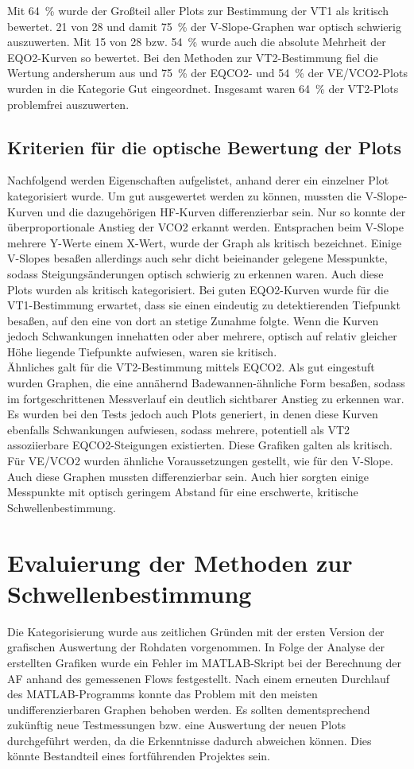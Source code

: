 %
Mit 64~\% wurde der Großteil aller Plots zur Bestimmung der VT1 als kritisch bewertet. 21 von 28 und damit 75~\% der V-Slope-Graphen war optisch schwierig auszuwerten. Mit 15 von 28 bzw. 54~\% wurde auch die absolute Mehrheit der \gls{EQO2}-Kurven so bewertet. Bei den Methoden zur VT2-Bestimmung fiel die Wertung andersherum aus und 75~\% der \gls{EQCO2}- und 54~\% der \gls{VE}/\gls{VCO2}-Plots wurden in die Kategorie Gut eingeordnet. Insgesamt waren 64~\% der VT2-Plots problemfrei auszuwerten.
%
\subsection{Kriterien für die optische Bewertung der Plots}
%
Nachfolgend werden Eigenschaften aufgelistet, anhand derer ein einzelner Plot kategorisiert wurde. Um gut ausgewertet werden zu können, mussten die V-Slope-Kurven und die dazugehörigen \gls{HF}-Kurven differenzierbar sein. Nur so konnte der überproportionale Anstieg der \gls{VCO2} erkannt werden. Entsprachen beim V-Slope mehrere Y-Werte einem X-Wert, wurde der Graph als kritisch bezeichnet. Einige V-Slopes besaßen allerdings auch sehr dicht beieinander gelegene Messpunkte, sodass Steigungsänderungen optisch schwierig zu erkennen waren. Auch diese Plots wurden als kritisch kategorisiert.
\clearpage
Bei guten \gls{EQO2}-Kurven wurde für die VT1-Bestimmung erwartet, dass sie einen eindeutig zu detektierenden Tiefpunkt besaßen, auf den eine von dort an stetige Zunahme folgte. Wenn die Kurven jedoch Schwankungen innehatten oder aber mehrere, optisch auf relativ gleicher Höhe liegende Tiefpunkte aufwiesen, waren sie kritisch.\\
Ähnliches galt für die VT2-Bestimmung mittels \gls{EQCO2}. Als gut eingestuft wurden Graphen, die eine annähernd Badewannen-ähnliche Form besaßen, sodass im fortgeschrittenen Messverlauf ein deutlich sichtbarer Anstieg zu erkennen war. Es wurden bei den Tests jedoch auch Plots generiert, in denen diese Kurven ebenfalls Schwankungen aufwiesen, sodass mehrere, potentiell als VT2 assoziierbare \gls{EQCO2}-Steigungen existierten. Diese Grafiken galten als kritisch.\\
Für \gls{VE}/\gls{VCO2} wurden ähnliche Voraussetzungen gestellt, wie für den V-Slope. Auch diese Graphen mussten differenzierbar sein. Auch hier sorgten einige Messpunkte mit optisch geringem Abstand für eine erschwerte, kritische Schwellenbestimmung. 
%
\section{Evaluierung der Methoden zur Schwellenbestimmung}
%
Die Kategorisierung wurde aus zeitlichen Gründen mit der ersten Version der grafischen Auswertung der Rohdaten vorgenommen. In Folge der Analyse der erstellten Grafiken wurde ein Fehler im MATLAB-Skript bei der Berechnung der \gls{AF} anhand des gemessenen Flows festgestellt. Nach einem erneuten Durchlauf des MATLAB-Programms konnte das Problem mit den meisten undifferenzierbaren Graphen behoben werden. Es sollten dementsprechend zukünftig neue Testmessungen bzw. eine Auswertung der neuen Plots durchgeführt werden, da die Erkenntnisse dadurch abweichen können. Dies könnte Bestandteil eines fortführenden Projektes sein.
%
